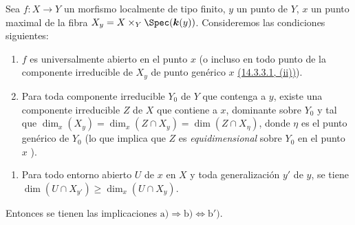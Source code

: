 \begin{proposition}[14.3.13]
\label{IV.14.3.13}
Sea $f:X\to Y$ un morfismo localmente de tipo finito, $y$ un punto de $Y$, $x$ un punto maximal de la fibra $X_y=X\times_Y\Spec(\boldsymbol{k}(y))$.
Consideremos las condiciones siguientes:
\begin{enumerate}[label=\emph{\alph*)}]
  \item $f$ es universalmente abierto en el punto $x$ \textup{(o incluso en todo punto de la componente irreducible de $X_y$ de punto genérico $x$ {\hyperlink{ega4.c04.subsec.14-3-3-1}{(14.3.3.1, (ii))}})}.
  \item Para toda componente irreducible $Y_0$ de $Y$ que contenga a $y$, existe una componente irreducible $Z$ de $X$ que contiene a $x$, dominante sobre $Y_0$ y tal que $\dim_x(X_y)=\dim_x(Z\cap X_y)=\dim(Z\cap X_\eta)$, donde $\eta$ es el punto genérico de $Y_0$ \textup{(lo que implica que $Z$ es \emph{equidimensional} sobre $Y_0$ en el punto $x$ )}.
\end{enumerate}


\begin{enumerate}[label=\emph{\alph*$'$)}]
  \item[\textup{b$'$)}] Para todo entorno abierto $U$ de $x$ en $X$ y toda generalización $y'$ de $y$, se tiene $\dim(U\cap X_{y'})\geq\dim_x(U\cap X_y)$.
\end{enumerate}

Entonces se tienen las implicaciones $\mathrm{a})\Rightarrow\mathrm{b})\Leftrightarrow\mathrm{b}')$.
\end{proposition}

